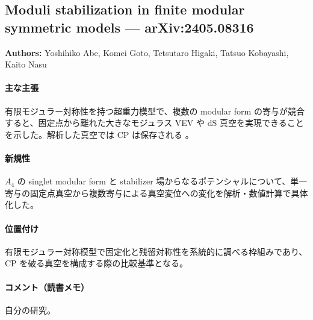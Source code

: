 \subsection{Moduli stabilization in finite modular symmetric models --- arXiv:2405.08316}

\textbf{Authors:} Yoshihiko Abe, Komei Goto, Tetsutaro Higaki, Tatsuo Kobayashi, Kaito Nasu

\paragraph{主な主張}
有限モジュラー対称性を持つ超重力模型で、複数の modular form の寄与が競合すると、固定点から離れた大きなモジュラス VEV や dS 真空を実現できることを示した。解析した真空では CP は保存される \cite{Abe:2024tox}。

\paragraph{新規性}
$A_4$ の singlet modular form と stabilizer 場からなるポテンシャルについて、単一寄与の固定点真空から複数寄与による真空変位への変化を解析・数値計算で具体化した。

\paragraph{位置付け}
有限モジュラー対称模型で固定化と残留対称性を系統的に調べる枠組みであり、CP を破る真空を構成する際の比較基準となる。

\paragraph{コメント（読書メモ）}
自分の研究。
